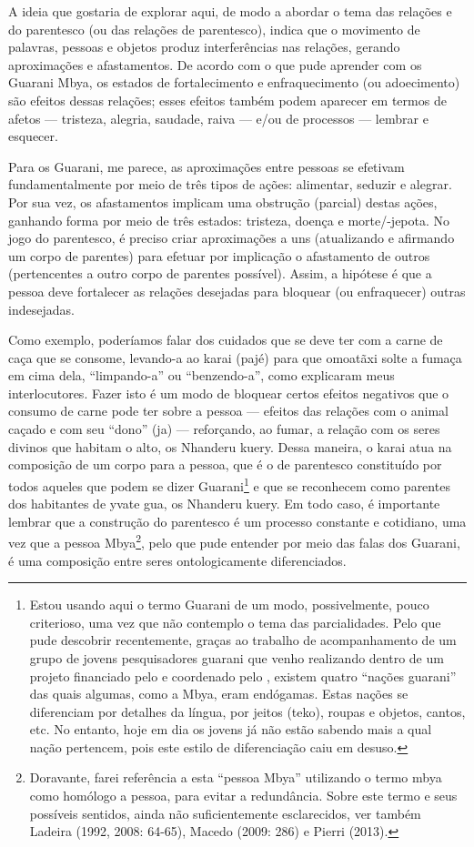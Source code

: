 A ideia que gostaria de explorar aqui, de modo a abordar o tema das
relações e do parentesco (ou das relações de parentesco), indica que o
movimento de palavras, pessoas e objetos produz interferências nas
relações, gerando aproximações e afastamentos. De acordo com o que pude
aprender com os Guarani Mbya, os estados de fortalecimento e
enfraquecimento (ou adoecimento) são efeitos dessas relações; esses
efeitos também podem aparecer em termos de afetos --- tristeza, alegria,
saudade, raiva --- e/ou de processos --- lembrar e esquecer.

Para os Guarani, me parece, as aproximações entre pessoas se efetivam
fundamentalmente por meio de três tipos de ações: alimentar, seduzir e
alegrar. Por sua vez, os afastamentos implicam uma obstrução (parcial)
destas ações, ganhando forma por meio de três estados: tristeza, doença
e morte/-jepota. No jogo do parentesco, é preciso criar aproximações a
uns (atualizando e afirmando um corpo de parentes) para efetuar por
implicação o afastamento de outros (pertencentes a outro corpo de
parentes possível). Assim, a hipótese é que a pessoa deve fortalecer as
relações desejadas para bloquear (ou enfraquecer) outras indesejadas.

Como exemplo, poderíamos falar dos cuidados que se deve ter com a carne
de caça que se consome, levando-a ao karai (pajé) para que omoatãxi
solte a fumaça em cima dela, ``limpando-a'' ou ``benzendo-a'', como
explicaram meus interlocutores. Fazer isto é um modo de bloquear
certos efeitos negativos que o consumo de carne pode ter sobre a pessoa
--- efeitos das relações com o animal caçado e com seu ``dono'' (ja) ---
reforçando, ao fumar, a relação com os seres divinos que habitam o
alto, os Nhanderu kuery. Dessa maneira, o karai atua na composição de
um corpo para a pessoa, que é o de parentesco constituído por todos
aqueles que podem se dizer Guarani\footnote{Estou usando aqui o termo
Guarani de um modo, possivelmente, pouco criterioso, uma vez que não
contemplo o tema das parcialidades. Pelo que pude descobrir
recentemente, graças ao trabalho de acompanhamento de um grupo de
jovens pesquisadores guarani que venho realizando dentro de um projeto
financiado pelo  e coordenado pelo , existem quatro ``nações
guarani'' das quais algumas, como a Mbya, eram endógamas. Estas nações
se diferenciam por detalhes da língua, por jeitos (teko), roupas e
objetos, cantos, etc. No entanto, hoje em dia os jovens já não estão
sabendo mais a qual nação pertencem, pois este estilo de diferenciação
caiu em desuso.} e que se reconhecem como parentes dos habitantes de
yvate gua, os Nhanderu kuery. Em todo caso, é importante lembrar que a
construção do parentesco é um processo constante e cotidiano, uma vez
que a pessoa Mbya\footnote{Doravante, farei referência a esta ``pessoa
Mbya'' utilizando o termo mbya como homólogo a pessoa, para evitar a
redundância. Sobre este termo e seus possíveis sentidos, ainda não
suficientemente esclarecidos, ver também Ladeira (1992, 2008: 64-65),
Macedo (2009: 286) e Pierri (2013).  }, pelo que pude entender por meio
das falas dos Guarani, é uma composição entre seres ontologicamente
diferenciados.

